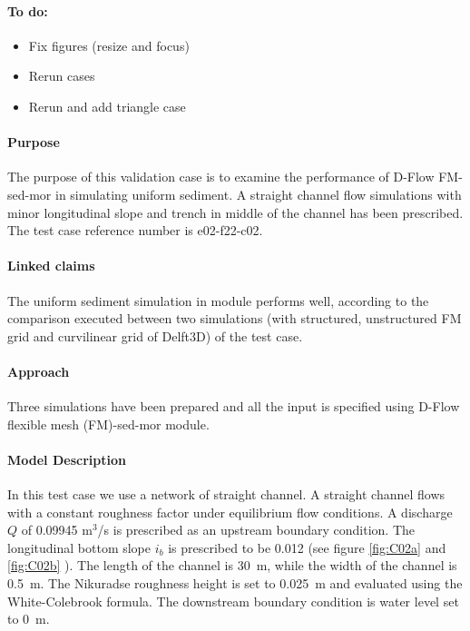 \label{case:e02-f22-c02}

\paragraph*{To do:}
\begin{itemize}
	\item Fix figures (resize and focus)
	\item Rerun cases
	\item Rerun and add triangle case
\end{itemize}


\paragraph*{Purpose}
The purpose of this validation case is to examine the performance of D-Flow FM-sed-mor in simulating uniform sediment. A straight channel flow simulations with minor longitudinal slope and trench in middle of the channel has been prescribed. The test case reference number is e02-f22-c02.

\paragraph*{Linked claims}
The uniform sediment simulation in module performs well, according to the comparison executed between two simulations (with structured, unstructured FM grid and curvilinear grid of Delft3D) of the test case.

\paragraph*{Approach}
Three simulations have been prepared
and all the input is specified using D-Flow flexible mesh (FM)-sed-mor module.

\paragraph*{Model Description}
In this test case  we use a network of straight channel. A straight channel flows with a constant roughness factor under equilibrium flow conditions. A discharge $Q$ of 0.09945 m$^3$/s is prescribed as an upstream boundary condition. The longitudinal bottom slope $i_b$ is prescribed to be 0.012 (see figure \ref{fig:C02a} and \ref{fig:C02b} ). The length of the channel is 30~m, while the width of the channel is 0.5~m. The Nikuradse roughness height is set to 0.025~m and evaluated using the White-Colebrook formula. The downstream boundary condition is water level set to 0~m.

